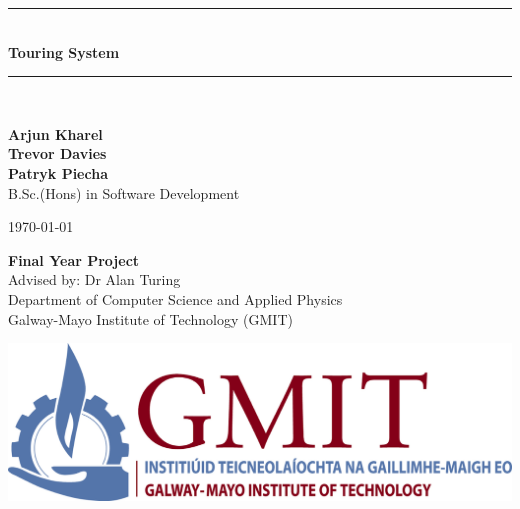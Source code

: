 \documentclass[12pt,a4paper,oneside,openany]{book}
\newcommand{\projecttitle}{Touring System}
\newcommand{\projectauthor}{Arjun Kharel
	 \\[0.2cm] Trevor Davies
	 \\[0.2cm] Patryk Piecha}
\newcommand{\projectadvisor}{Dr Alan Turing}
\newcommand{\projectprogramme}{B.Sc.(Hons) in Software Development}
\newcommand{\projectdate}{\today}
\begin{document}
	\begin{titlepage}
		\begin{minipage}[t][6cm]{\textwidth}
			\centering
			\rule{\linewidth}{0.5mm} \\[0.4cm]
			{ \LARGE \bfseries \projecttitle \\[0.4cm] }
			\rule{\linewidth}{0.5mm} \\[0.8cm]
		\end{minipage}
		
		\begin{minipage}[t][6.5cm]{\textwidth}
			\centering
			\textbf{\projectauthor}\\[0.5cm]
			\projectprogramme
		\end{minipage}
		
		\begin{minipage}[t][1cm]{\textwidth}
			\centering
			\textsc{\projectdate}
		\end{minipage}
		
		\begin{minipage}[t][3cm]{\textwidth}
			\centering
			\textbf{Final Year Project}\\[0.3cm]
			Advised by: \projectadvisor \\[0.1cm]
			Department of Computer Science and Applied Physics\\
			Galway-Mayo Institute of Technology (GMIT)
		\end{minipage}
		
		\begin{center}    
			\includegraphics{img/gmit-logo.jpg}
		\end{center}
	\end{titlepage}
	\setcounter{page}{2}
	\tableofcontents
	
	
	
\end{document}
